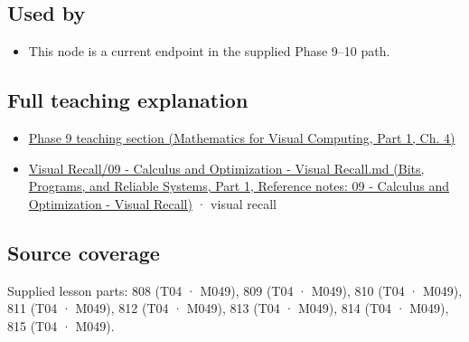 \subsection{Used by}\label{appendix-d9f70bdfbc92-used-by}

\hypertarget{appendix-d9f70bdfbc92-used-by}{}

\begin{itemize}
\tightlist
\item
  This node is a current endpoint in the supplied Phase 9--10 path.
\end{itemize}

\subsection{Full teaching explanation}\label{appendix-d9f70bdfbc92-full-teaching-explanation}

\hypertarget{appendix-d9f70bdfbc92-full-teaching-explanation}{}

\begin{itemize}
\tightlist
\item
  \href{../02-Mathematics-for-Visual-Computing-P01/main.pdf\#01-foundations-i-ch020-functions-limits-continuity-and-scalar-change}{Phase 9 teaching section (Mathematics for Visual Computing, Part 1, Ch. 4)}
\item
  \href{../01-Bits-Programs-and-Reliable-Systems-P01/main.pdf\#appendix-adf48f5dc5c1}{Visual Recall/09 - Calculus and Optimization - Visual Recall.md (Bits, Programs, and Reliable Systems, Part 1, Reference notes: 09 - Calculus and Optimization - Visual Recall)} · visual recall
\end{itemize}

\subsection{Source coverage}\label{appendix-d9f70bdfbc92-source-coverage}

\hypertarget{appendix-d9f70bdfbc92-source-coverage}{}

Supplied lesson parts: 808 (T04 · M049), 809 (T04 · M049), 810 (T04 · M049), 811 (T04 · M049), 812 (T04 · M049), 813 (T04 · M049), 814 (T04 · M049), 815 (T04 · M049).
